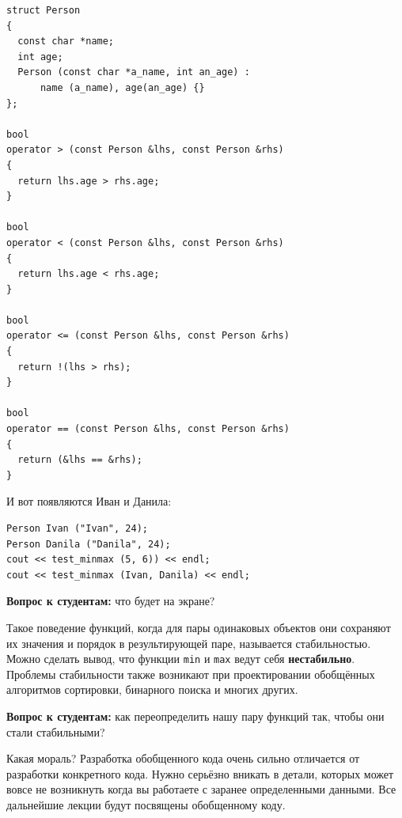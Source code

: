 \documentclass[a4paper,12pt,oneside]{article}
\newif\ifanswers
\begin{document}
\begin{lstlisting}
struct Person
{
  const char *name;
  int age;
  Person (const char *a_name, int an_age) : 
      name (a_name), age(an_age) {}
};

bool
operator > (const Person &lhs, const Person &rhs)
{
  return lhs.age > rhs.age;
}

bool
operator < (const Person &lhs, const Person &rhs)
{
  return lhs.age < rhs.age;
}

bool
operator <= (const Person &lhs, const Person &rhs)
{
  return !(lhs > rhs);
}

bool
operator == (const Person &lhs, const Person &rhs)
{
  return (&lhs == &rhs);
}
\end{lstlisting}

И вот появляются Иван и Данила:

\begin{lstlisting}
Person Ivan ("Ivan", 24);
Person Danila ("Danila", 24);
cout << test_minmax (5, 6)) << endl;
cout << test_minmax (Ivan, Danila) << endl;
\end{lstlisting}

\textbf{Вопрос к студентам:} что будет на экране?

\ifanswers
Правильный ответ: неожиданно на экране будет 1 и 0. 
\fi

Такое поведение функций, когда для пары одинаковых объектов они сохраняют их значения и порядок в результирующей паре, называется стабильностью. Можно сделать вывод, что функции \lstinline!min! и \lstinline!max! ведут себя \textbf{нестабильно}. Проблемы стабильности также возникают при проектировании обобщённых алгоритмов сортировки, бинарного поиска и многих других.

\textbf{Вопрос к студентам:} как переопределить нашу пару функций так, чтобы они стали стабильными?

\ifanswers
Один из вариантов решения

\begin{lstlisting}
template <class T> const T&
max (const T &x, const T &y)
{
  return ((x > y) ? x : y);
}

template <class T> const T&
min (const T &x, const T &y)
{
  return ((x <= y) ? x : y);
}
\end{lstlisting}
\fi

Какая мораль? Разработка обобщенного кода очень сильно отличается от разработки конкретного кода. Нужно серьёзно вникать в детали, которых может вовсе не возникнуть когда вы работаете с заранее определенными данными. Все дальнейшие лекции будут посвящены обобщенному коду. 
\end{document}
